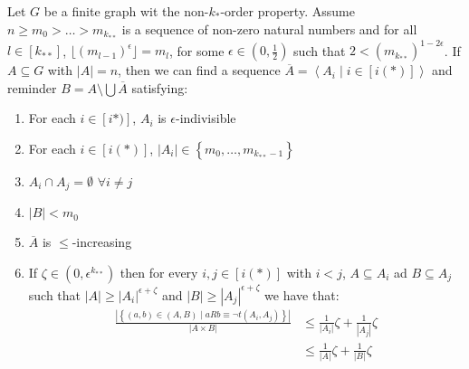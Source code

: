     \lemma[Claim 4.10]
        Let $G$ be a finite graph wit the non-$k_{*}$-order property.
        Assume $n \geq m_0 > \dots > m_{k_{**}}$ is a sequence of non-zero natural numbers and for all $l \in [k_{**}]$,
            $\lfloor (m_{l-1})^\epsilon \rfloor = m_l$, for some $\epsilon \in (0, \frac{1}{2})$ such that $2 < (m_{k_{**}})^{1-2\epsilon}$.
        If $A \subseteq G$ with $|A| = n$, then we can find a sequence $\overline{A} = \left< A_i \mid i \in [i(*)] \right>$
            and reminder $B = A \setminus \bigcup \overline{A}$ satisfying:
        \begin{enumerate}
            \item \label{itm:4.10.1} For each $i \in [i*)]$, $A_i$ is $\epsilon$-indivisible
            \item \label{itm:4.10.2} For each $i \in [i(*)]$, $|A_i| \in \left\{ m_0, \dots, m_{k_{**}-1} \right\}$
            \item \label{itm:4.10.3} $A_i \cap A_j = \emptyset$ $\forall i \neq j$
            \item \label{itm:4.10.4} $|B| < m_0$
            \item \label{itm:4.10.5} $\overline{A}$ is $\leq$-increasing
            \item \label{itm:4.10.6} If $\zeta \in \left(0,\epsilon^{k_{**}}\right)$ then for every $i,j \in [i(*)]$ with $i < j$,
                $A \subseteq A_i$ ad $B \subseteq A_j$ such that $|A| \geq |A_i|^{\epsilon + \zeta}$ and $|B| \geq |A_j|^{\epsilon + \zeta}$
                we have that:
                \[
                    \begin{split}
                        \frac{|\left\{ (a,b) \in (A,B) \mid a R b \equiv \neg t(A_i,A_j) \right\}|}{|A \times B|}
                            &\leq \frac{1}{|A_i|}\zeta + \frac{1}{|A_j|}\zeta \\
                            &\leq \frac{1}{|A|}\zeta + \frac{1}{|B|}\zeta
                    \end{split}
                \]
        \end{enumerate}

